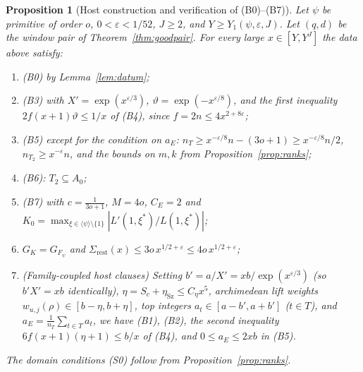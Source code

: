 \documentclass[11pt]{amsart}
\newcommand{\eps}{\varepsilon}
\theoremstyle{plain}
\newtheorem{proposition}[theorem]{Proposition}
\theoremstyle{definition}
\numberwithin{equation}{section}
\begin{document}
\begin{proposition}[Host construction and verification of (B0)--(B7)]\label{prop:hostB}
Let $\psi$ be primitive of order $o$, $0<\eps<1/52$, $J\ge2$, and $Y\ge Y_1(\psi,\eps,J)$. Let
$(q,d)$ be the window pair of Theorem~\ref{thm:goodpair}. For every large $x\in[Y,Y^J]$ the data
above satisfy:
\begin{enumerate}[label=(\roman*)]
\item \textup{(B0)} by Lemma~\ref{lem:datum};
\item \textup{(B3)} with $X'=\exp(x^{\eps/3})$, $\vartheta=\exp(-x^{\eps/8})$, and the first
  inequality $2f(x+1)\vartheta\le1/x$ of \textup{(B4)}, since $f=2n\le4x^{2+8\eps}$;
\item \textup{(B5)} except for the condition on $a_E$: $n_T\ge x^{-\eps/8}n-(3o+1)\ge x^{-\eps/8}n/2$,
  $n_{T_2}\ge x^{-\eps}n$, and the bounds on $m,k$ from Proposition~\ref{prop:ranks};
\item \textup{(B6)}: $T_2\subseteq A_0$;
\item \textup{(B7)} with $c=\frac1{3o+1}$, $M=4o$, $C_E=2$ and
  $K_0=\max_{\xi\in\langle\psi\rangle\setminus\{1\}}|L'(1,\xi^\ast)/L(1,\xi^\ast)|$;
\item $G_K=G_{F_\psi}$ and $\Sigma_{\mathrm{rest}}(x)\le3o\,x^{1/2+\eps}\le4o\,x^{1/2+\eps}$;
\item \textup{(Family-coupled host clauses)} Setting $b'=a/X'=xb/\exp(x^{\eps/3})$ (so $b'X'=xb$
  identically), $\eta=S_c+\eta_{\mathrm{Sz}}\le C_\eta x^5$, archimedean lift weights
  $w_{u,j}(\rho)\in[b-\eta,b+\eta]$, top integers $a_t\in[a-b',a+b']$ ($t\in T$), and
  $a_E=\frac{1}{n_T}\sum_{t\in T}a_t$, we have \textup{(B1)}, \textup{(B2)}, the second inequality
  $6f(x+1)(\eta+1)\le b/x$ of \textup{(B4)}, and $0\le a_E\le 2xb$ in \textup{(B5)}.
\end{enumerate}
The domain conditions \textup{(S0)} follow from Proposition~\ref{prop:ranks}.
\end{proposition}
\end{document}
